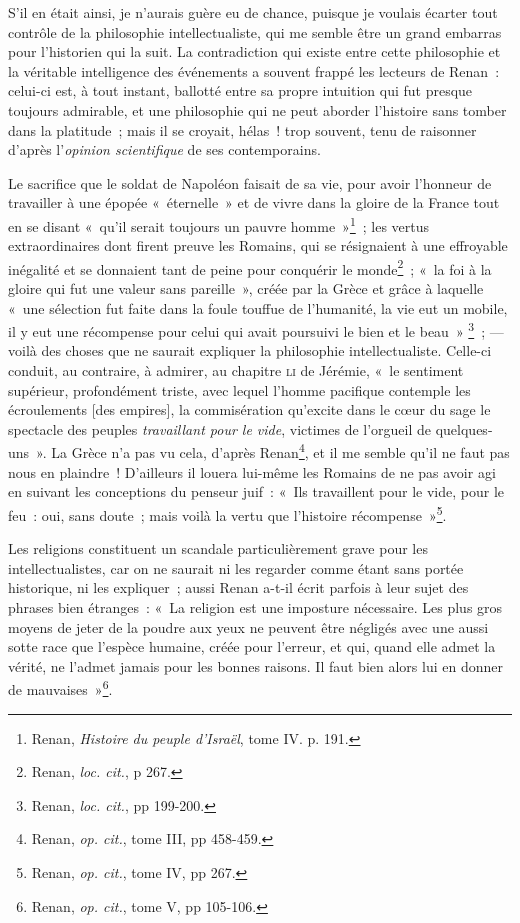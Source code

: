 \documentclass[french,twoside]{book} %
\begin{document}
S’il en était ainsi, je n’aurais guère eu de chance, puisque je voulais écarter tout contrôle de la philosophie intellectualiste, qui me semble être un grand embarras pour l’historien qui la suit. La contradiction qui existe entre cette philosophie et la véritable intelligence des événements a souvent frappé les lecteurs de Renan : celui-ci est, à tout instant, ballotté entre sa propre intuition qui fut presque toujours admirable, et une philosophie qui ne peut aborder l’histoire sans tomber dans la platitude ; mais il se croyait, hélas ! trop souvent, tenu de raisonner d’après l’\emph{opinion scientifique} de ses contemporains.\par
Le sacrifice que le soldat de Napoléon faisait de sa vie, pour avoir l’honneur de travailler à une épopée « éternelle » et de vivre dans la gloire de la France tout en se  disant « qu’il serait toujours un pauvre homme »\footnote{ \noindent Renan, \emph{Histoire du peuple d’Israël}, tome IV. p. 191.
 } ; les vertus extraordinaires dont firent preuve les Romains, qui se résignaient à une effroyable inégalité et se donnaient tant de peine pour conquérir le monde\footnote{ \noindent Renan, \emph{loc. cit.}, p 267.
 } ; « la foi à la gloire qui fut une valeur sans pareille », créée par la Grèce et grâce à laquelle « une sélection fut faite dans la foule touffue de l’humanité, la vie eut un mobile, il y eut une récompense pour celui qui avait poursuivi le bien et le beau » \footnote{ \noindent Renan, \emph{loc. cit.}, pp 199-200.
 } ; — voilà des choses que ne saurait expliquer la philosophie intellectualiste. Celle-ci conduit, au contraire, à admirer, au chapitre {\scshape li} de Jérémie, « le sentiment supérieur, profondément triste, avec lequel l’homme pacifique contemple les écroulements [des empires], la commisération qu’excite dans le cœur du sage le spectacle des peuples \emph{travaillant pour le vide}, victimes de l’orgueil de quelques-uns ». La Grèce n’a pas vu cela, d’après Renan\footnote{ \noindent Renan, \emph{op. cit.}, tome III, pp 458-459.
 }, et il me semble qu’il ne faut pas nous en plaindre ! D’ailleurs il louera lui-même les Romains de ne pas avoir agi en suivant les conceptions du penseur juif : « Ils travaillent pour le vide, pour le feu : oui, sans doute ; mais voilà la vertu que l’histoire récompense »\footnote{ \noindent Renan, \emph{op. cit.}, tome IV, pp 267.
 }.\par
Les religions constituent un scandale particulièrement grave pour les intellectualistes, car on ne saurait ni les regarder comme étant sans portée historique, ni les  expliquer ; aussi Renan a-t-il écrit parfois à leur sujet des phrases bien étranges : « La religion est une imposture nécessaire. Les plus gros moyens de jeter de la poudre aux yeux ne peuvent être négligés avec une aussi sotte race que l’espèce humaine, créée pour l’erreur, et qui, quand elle admet la vérité, ne l’admet jamais pour les bonnes raisons. Il faut bien alors lui en donner de mauvaises »\footnote{ \noindent Renan, \emph{op. cit.}, tome V, pp 105-106.
 }.\par
\end{document}
